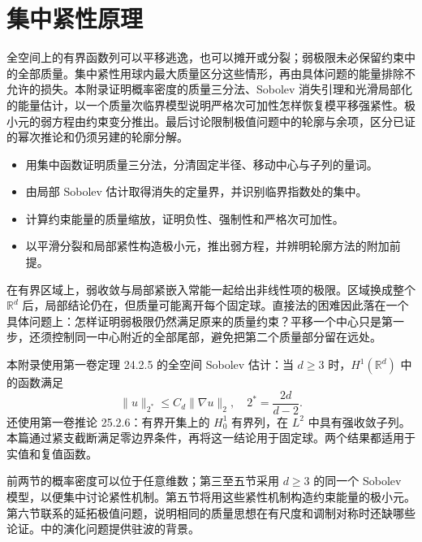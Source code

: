 \chapter{集中紧性原理}
\label{b2:app:F}

\begin{chapterabstract}
全空间上的有界函数列可以平移逃逸，也可以摊开或分裂；弱极限未必保留约束中的全部质量。集中紧性用球内最大质量区分这些情形，再由具体问题的能量排除不允许的损失。本附录证明概率密度的质量三分法、Sobolev 消失引理和光滑局部化的能量估计，以一个质量次临界模型说明严格次可加性怎样恢复模平移强紧性。极小元的弱方程由约束变分推出。最后讨论限制极值问题中的轮廓与余项，区分已证的幂次推论和仍须另建的轮廓分解。
\end{chapterabstract}

\begin{learninggoals}\begin{itemize}
\item\label{b2:item:app-F-goal-1}用集中函数证明质量三分法，分清固定半径、移动中心与子列的量词。
\item\label{b2:item:app-F-goal-2}由局部 Sobolev 估计取得消失的定量界，并识别临界指数处的集中。
\item\label{b2:item:app-F-goal-3}计算约束能量的质量缩放，证明负性、强制性和严格次可加性。
\item\label{b2:item:app-F-goal-4}以平滑分裂和局部紧性构造极小元，推出弱方程，并辨明轮廓方法的附加前提。
\end{itemize}\end{learninggoals}

在有界区域上，弱收敛与局部紧嵌入常能一起给出非线性项的极限。区域换成整个 \(\mathbb R^d\) 后，局部结论仍在，但质量可能离开每个固定球。直接法的困难因此落在一个具体问题上：怎样证明弱极限仍然满足原来的质量约束？平移一个中心只是第一步，还须控制同一中心附近的全部尾部，避免把第二个质量部分留在远处。

\ProseParagraphBreak

本附录使用第一卷定理 24.2.5 的全空间 Sobolev 估计：当 \(d\ge3\) 时，\(H^1(\mathbb R^d)\) 中的函数满足
\[
 \|u\|_{2^*}\le C_d\|\nabla u\|_2,
 \quad 2^*=\frac{2d}{d-2}.
\]
还使用第一卷推论 25.2.6：有界开集上的 \(H_0^1\) 有界列，在 \(L^2\) 中具有强收敛子列。本篇通过紧支截断满足零边界条件，再将这一结论用于固定球。两个结果都适用于实值和复值函数。

\ProseParagraphBreak

前两节的概率密度可以位于任意维数；第三至五节采用 \(d\ge3\) 的同一个 Sobolev 模型，以便集中讨论紧性机制。第五节将用这些紧性机制构造约束能量的极小元。第六节联系的延拓极值问题，说明相同的质量思想在有尺度和调制对称时还缺哪些论证。中的演化问题提供驻波的背景。

